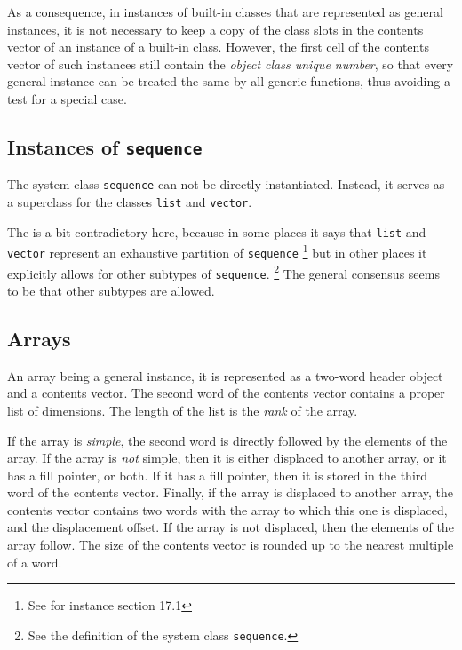 As a consequence, in instances of built-in classes that are
represented as general instances, it is not necessary to keep a copy of the
class slots in the contents vector of an instance of a built-in class.
However, the first cell of the contents vector of such instances still
contain the \emph{object class unique number}, so that every general
instance can be treated the same by all generic functions, thus
avoiding a test for a special case.

\subsection{Instances of \texttt{sequence}}

The system class \texttt{sequence} can not be directly instantiated.
Instead, it serves as a superclass for the classes \texttt{list} and
\texttt{vector}.  

The \hs{} is a bit contradictory here, because
in some places it says that \texttt{list} and \texttt{vector}
represent an exhaustive partition of \texttt{sequence}%
\footnote{See for instance section 17.1}
but in other places it explicitly allows for other subtypes of
\texttt{sequence}.%
\footnote{See the definition of the system class \texttt{sequence}.}
The general consensus seems to be that other subtypes are allowed. 


\subsection{Arrays}
\label{sec-data-representation-arrays}

An array being a general instance, it is represented as a two-word
header object and a contents vector.  The second word of the contents
vector contains a proper list of dimensions.  The length of the list
is the \emph{rank} of the array.

If the array is \emph{simple}, the second word is directly followed
by the elements of the array.  If the array is \emph{not} simple, then
it is either displaced to another array, or it has a fill pointer, or
both.  If it has a fill pointer, then it is stored in the third word
of the contents vector.  Finally, if the array is displaced to another
array, the contents vector contains two words with the array to which
this one is displaced, and the displacement offset.  If the array is
not displaced, then the elements of the array follow.  The size of the
contents vector is rounded up to the nearest multiple of a word. 

